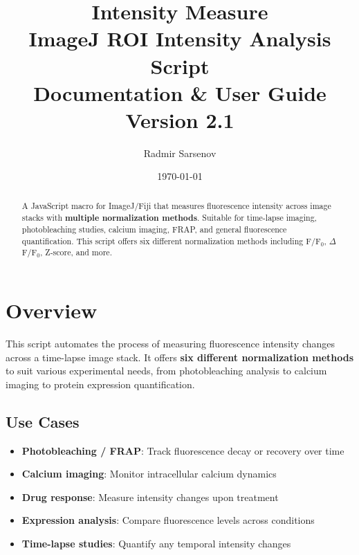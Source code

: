 \documentclass[11pt,a4paper]{article}
\title{
    \vspace{-1cm}
    \textbf{\LARGE Intensity Measure}\\[0.5cm]
    \large ImageJ ROI Intensity Analysis Script\\[0.3cm]
    \normalsize Documentation \& User Guide\\[0.2cm]
    \small Version 2.1
}
\author{Radmir Sarsenov}
\date{\today}
\begin{document}
\maketitle
\thispagestyle{empty}

\vspace{1cm}

\begin{abstract}
\noindent
A JavaScript macro for ImageJ/Fiji that measures fluorescence intensity across image stacks with \textbf{multiple normalization methods}. Suitable for time-lapse imaging, photobleaching studies, calcium imaging, FRAP, and general fluorescence quantification. This script offers six different normalization methods including F/F$_0$, $\Delta$F/F$_0$, Z-score, and more.
\end{abstract}

\vspace{0.5cm}
\tableofcontents
\newpage

\section{Overview}

This script automates the process of measuring fluorescence intensity changes across a time-lapse image stack. It offers \textbf{six different normalization methods} to suit various experimental needs, from photobleaching analysis to calcium imaging to protein expression quantification.

\subsection{Use Cases}

\begin{itemize}[leftmargin=*]
    \item \textbf{Photobleaching / FRAP}: Track fluorescence decay or recovery over time
    \item \textbf{Calcium imaging}: Monitor intracellular calcium dynamics
    \item \textbf{Drug response}: Measure intensity changes upon treatment
    \item \textbf{Expression analysis}: Compare fluorescence levels across conditions
    \item \textbf{Time-lapse studies}: Quantify any temporal intensity changes
\end{itemize}
\end{document}
